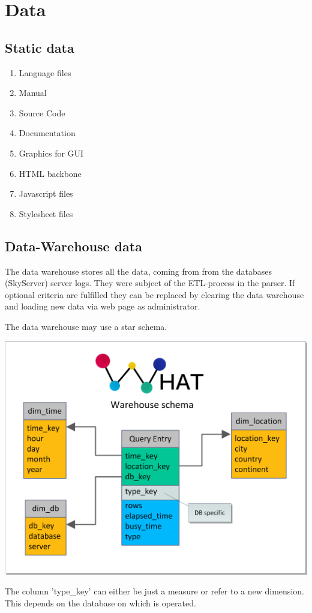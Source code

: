 \section{Data}
\renewcommand{\theenumi}{/D\arabic{enumi}0/}
\renewcommand{\labelenumi}{\theenumi}

\subsection{Static data}

\begin{enumerate}
  \item Language files
  \item Manual
  \item Source Code
  \item Documentation
  \item Graphics for GUI
  \item HTML backbone
  \item Javascript files
  \item Stylesheet files
\end{enumerate}



\newpage
\subsection{Data-Warehouse data} \label{WHschema}


The \gls{data warehouse} stores all the data, coming from from the \glspl{database} (\gls{SkyServer}) server logs.
They were subject of the \gls{ETL-process} in the parser. If optional criteria are fulfilled
 they can be replaced by clearing the \gls{data warehouse} 
 and loading new data via web page as administrator.

The \gls{data warehouse} may use a star schema.
\begin{center}
\includegraphics[width=1\linewidth]{Pictures/WareHouseSchema.png} 
\end{center}   
The column 'type\_key' can either be just a measure or refer to a new \gls{dimension}. This depends on the \gls{database}
on which is operated.  

